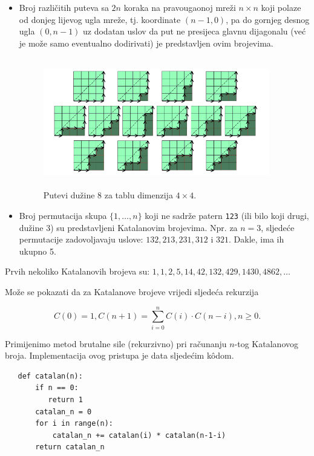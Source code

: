  \begin{itemize}
 	\item Broj različitih puteva sa $2n$ koraka na pravougaonoj mreži $n \times n$ koji polaze od 	donjeg lijevog ugla mreže, tj. koordinate $(n - 1, 0)$, pa do gornjeg desnog ugla $(0, n -1)$ uz dodatan uslov da put ne presijeca glavnu dijagonalu (već je može samo eventualno dodirivati) je predstavljen ovim brojevima.
 	
 	\begin{figure}[H]
 		\centering
 		\includegraphics[width=280pt,height=160pt]{slike/catalan-net.png}
 		\caption{Putevi dužine 8 za tablu dimenzija $4\times 4$.} \label{fig:catalan-n-4}
 	\end{figure}
 	\item Broj permutacija skupa $\{1, \ldots, n \}$ koji ne sadrže patern \texttt{123} (ili bilo koji drugi, dužine 3) su predstavljeni Katalanovim brojevima. Npr. za $n = 3$, sljedeće permutacije zadovoljavaju uslove: $132,
 	213, 231, 312$ i $321$.  Dakle, ima ih ukupno 5. 
 \end{itemize}
 
 Prvih nekoliko Katalanovih brojeva su: $1, 1, 2, 5, 14, 42, 132,
 429, 1430, 4862, \ldots $
 
 
 Može se pokazati da za Katalanove brojeve vrijedi sljedeća rekurzija
 
 $$C(0) = 1, C(n+1) = \sum_{i=0}^{n} C(i) \cdot C(n-i), n \geq  0.$$
 
 Primijenimo metod brutalne sile (rekurzivno) pri računanju $n$-tog Katalanovog broja. Implementacija ovog pristupa je data sljedećim k\^odom. 
 
 \begin{verbatim}
   def catalan(n):
       if n == 0:
          return 1
       catalan_n = 0 
       for i in range(n): 
           catalan_n += catalan(i) * catalan(n-1-i) 
       return catalan_n
        
 \end{verbatim}
  
